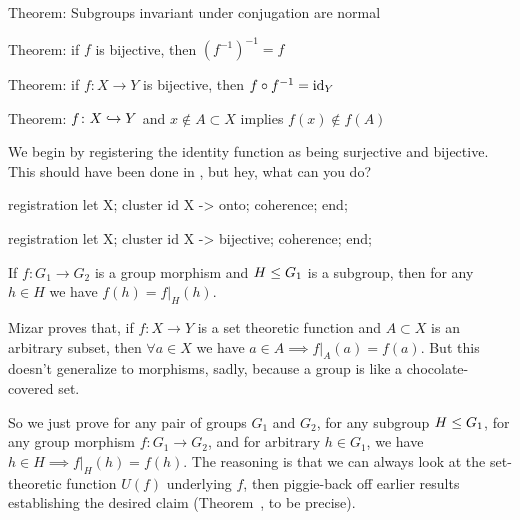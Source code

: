 \LA{}Theorem: Subgroups invariant under conjugation are normal~{\nwtagstyle{}}\RA{}

\LA{}Theorem: if $f$ is bijective, then $(f^{-1})^{-1}=f$~{\nwtagstyle{}}\RA{}

\LA{}Theorem: if $f\colon X\to Y$ is bijective, then $f\circ f^{-1}=\operatorname{id}_{Y}$~{\nwtagstyle{}}\RA{}

\LA{}Theorem: $f\colon X\hookrightarrow Y$ and $x\notin A\subset X$ implies $f(x)\notin f(A)$~{\nwtagstyle{}}\RA{}
\nwendcode{}\nwdocspar


\begin{registration}
We begin by registering the identity function as being surjective and
bijective. This should have been done in , but hey, what can
you do?
\end{registration}

\nwenddocs{}\endmoddef\nwstartdeflinemarkup{}\nwenddeflinemarkup
registration
  let X;
  cluster id X -> onto;
  coherence;
end;

registration
  let X;
  cluster id X -> bijective;
  coherence;
end;
\nwendcode{}\nwdocspar

\begin{theorem}\label{thm:characteristic:preparatory:restrict-group-morphism-to-subgroups}
If $f\colon G_{1}\to G_{2}$ is a group morphism and $H\leq G_{1}$
is a subgroup, then for any $h\in H$ we have $f(h) = f|_{H}(h)$.
\end{theorem}

\begin{thm-remark}
Mizar proves that, if $f\colon X\to Y$ is a set theoretic function and
$A\subset X$ is an arbitrary subset, then $\forall a\in X$ we have
$a\in A\implies f|_{A}(a)=f(a)$. But this doesn't generalize to
morphisms, sadly, because a group is like a chocolate-covered set.

So we just prove for any pair of groups $G_{1}$ and $G_{2}$,
for any subgroup $H\leq G_{1}$,
for any group morphism $f\colon G_{1}\to G_{2}$, and for arbitrary $h\in G_{1}$,
we have $h\in H\implies f|_{H}(h) = f(h)$. The reasoning is that we can
always look at the set-theoretic function $U(f)$ underlying $f$, then
piggie-back off earlier results establishing the desired claim
(Theorem~, to be precise).
\end{thm-remark}


